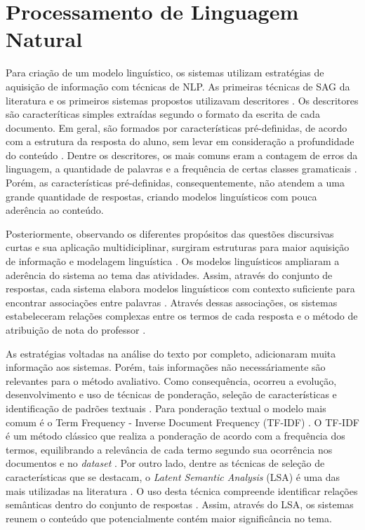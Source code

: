 \section{Processamento de Linguagem Natural}

Para criação de um modelo linguístico, os sistemas utilizam estratégias de aquisição de informação com técnicas de NLP. As primeiras técnicas de SAG da literatura e os primeiros sistemas propostos utilizavam descritores \cite{galhardi2018a}. Os descritores são caracteríticas simples extraídas segundo o formato da escrita de cada documento. Em geral, são formados por características pré-definidas, de acordo com a estrutura da resposta do aluno, sem levar em consideração a profundidade do conteúdo \cite{mohler2009}. Dentre os descritores, os mais comuns eram a contagem de erros da linguagem, a quantidade de palavras e a frequência de certas classes gramaticais \cite{riordan2019, galhardi2018b}. Porém, as características pré-definidas, consequentemente, não atendem a uma grande quantidade de respostas, criando modelos linguísticos com pouca aderência ao conteúdo.

Posteriormente, observando os diferentes propósitos das questões discursivas curtas e sua aplicação multidiciplinar, surgiram estruturas para maior aquisição de informação e modelagem linguística \cite{kumar2019, saha2018}. Os modelos linguísticos ampliaram a aderência do sistema ao tema das atividades. Assim, através do conjunto de respostas, cada sistema elabora modelos linguísticos com contexto suficiente para encontrar associações entre palavras \cite{tan2020}. Através dessas associações, os sistemas estabeleceram relações complexas entre os termos de cada resposta e o método de atribuição de nota do professor \cite{sahu2020}.

As estratégias voltadas na análise do texto por completo, adicionaram muita informação aos sistemas. Porém, tais informações não necessáriamente são relevantes para o método avaliativo. Como consequência, ocorreu a evolução, desenvolvimento e uso de técnicas de ponderação, seleção de características e identificação de padrões textuais \cite{banjade2016}. Para ponderação textual o modelo mais comum é o Term Frequency - Inverse Document Frequency (TF-IDF) \cite{baeza2011}. O TF-IDF é um método clássico que realiza a ponderação de acordo com a frequência dos termos, equilibrando a relevância de cada termo segundo sua ocorrência nos documentos e no \textit{dataset} \cite{sultan2016}. Por outro lado, dentre as técnicas de seleção de características que se destacam, o \textit{Latent Semantic Analysis} (LSA) \cite{landauer1998} é uma das mais utilizadas na literatura \cite{basu2013, sahu2020}. O uso desta técnica compreende identificar relações semânticas dentro do conjunto de respostas \cite{mohler2009}. Assim, através do LSA, os sistemas reunem o conteúdo que potencialmente contém maior significância no tema.


